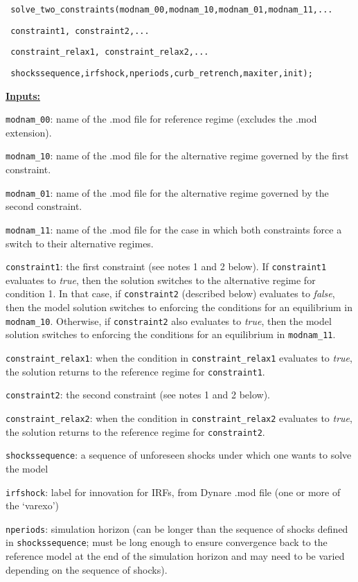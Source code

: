 \documentclass[12pt]{article}
\begin{document}
\begin{enumerate}
\texttt{\
solve\_two\_constraints(modnam\_00,modnam\_10,modnam\_01,modnam\_11,...}

\texttt{\ constraint1, constraint2,...}

\texttt{\ constraint\_relax1, constraint\_relax2,...}

\texttt{\ shockssequence,irfshock,nperiods,curb\_retrench,maxiter,init);}

\medskip

\underline{\textbf{Inputs:}}

\texttt{modnam\_00}: name of the .mod file for reference regime (excludes the .mod extension).

\texttt{modnam\_10}: name of the .mod file for the alternative regime governed by the first constraint.

\texttt{modnam\_01}: name of the .mod file for the alternative regime governed by the second constraint.

\texttt{modnam\_11}: name of the .mod file for the case in which both constraints force a switch to their alternative regimes.

\texttt{constraint1}: the first constraint (see notes 1 and 2 below). If \texttt{constraint1} evaluates to \emph{true}, then the solution switches to the alternative regime for condition 1. In that case, if \texttt{constraint2} (described below) evaluates to \emph{false}, then the model solution switches to enforcing the conditions for an equilibrium in \texttt{modnam\_10}.
Otherwise, if \texttt{constraint2} also evaluates to \emph{true}, then the model solution switches to enforcing the conditions for an equilibrium in \texttt{modnam\_11}.

\texttt{constraint\_relax1}: when the condition in \texttt{constraint\_relax1} evaluates to \emph{true}, the solution returns to the reference regime for \texttt{constraint1}.

\texttt{constraint2}: the second constraint (see notes 1 and 2 below).

\texttt{constraint\_relax2}: when the condition in \texttt{constraint\_relax2} evaluates to \emph{true}, the solution returns to the reference regime for \texttt{constraint2}.

\texttt{shockssequence}: a sequence of unforeseen shocks under which one
wants to solve the model

\texttt{irfshock}: label for innovation for IRFs, from Dynare .mod file (one
or more of the `varexo')

\texttt{nperiods}: simulation horizon (can be longer than the sequence of
shocks defined in \texttt{shockssequence}; must be long
enough to ensure convergence back to the reference model at the end of the
simulation horizon and may need to be varied depending on the sequence of shocks).


\end{enumerate}
\end{document}
